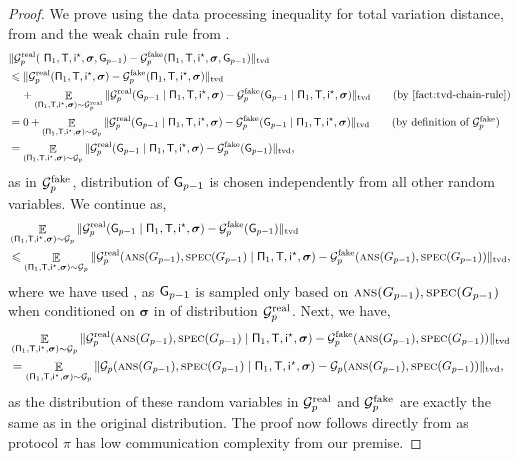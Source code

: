 \documentclass[11pt]{article}
\theoremstyle{definition}
\renewcommand{\leq}{\leqslant}
\newcommand{\tvd}[2]{\ensuremath{\norm{#1 - #2}_{\mathrm{tvd}}}}
\newcommand{\norm}[1]{\ensuremath{\|#1\|}}
\DeclareMathOperator*{\Exp}{\ensuremath{{\mathbb{E}}}}
\newcommand{\rv}[1]{\ensuremath{{\mathsf{#1}}}\xspace}
\newcommand{\cG}{\ensuremath{\mathcal{G}}}
\newcommand{\ans}{\ensuremath{\textnormal{\textsc{ans}}}}
\newcommand{\spec}{\ensuremath{\textnormal{\textsc{spec}}}}
\newcommand{\prot}{\ensuremath{\pi}}
\newcommand{\Prot}{\ensuremath{\Pi}}
\newcommand{\rProt}{\ensuremath{\rv{\Prot}}}
\newcommand{\rT}{\ensuremath{\rv{T}}}
\newcommand{\rsigma}{\ensuremath{\bm{\sigma}}}
\begin{document}
	\begin{proof}
		We prove  using the data processing inequality for total variation distance, from  and the weak chain rule from . 
		\begin{align*}
			&\tvd{\cGreal_p(\ \rProt_1, \rT, \ristar, \rsigma, \rG_{p-1})}{\cGfake_p(\rProt_1, \rT, \ristar, \rsigma, \rG_{p-1})} \\
			&\leq \tvd{\cGreal_p( \rProt_1, \rT, \ristar, \rsigma)}{\cGfake_p(\rProt_1, \rT, \ristar, \rsigma)} \\
			&\hspace{4mm} + \Exp_{ (\rProt_1, \rT, \ristar, \rsigma) \sim \cGreal_p} \tvd{\cGreal_p(\rG_{p-1} \mid  \rProt_1, \rT, \ristar, \rsigma)}{\cGfake_p(\rG_{p-1} \mid \rProt_1, \rT, \ristar, \rsigma)} \tag{by \Cref{fact:tvd-chain-rule}} \\
			&= 0 + \Exp_{ (\rProt_1, \rT, \ristar, \rsigma) \sim \cG_p} \tvd{\cGreal_p(\rG_{p-1} \mid  \rProt_1, \rT, \ristar, \rsigma)}{\cGfake_p(\rG_{p-1} \mid \rProt_1, \rT, \ristar, \rsigma)} \tag{by definition of $\cGfake_p$} \\
			&= \Exp_{ (\rProt_1, \rT, \ristar, \rsigma) \sim \cG_p} \tvd{\cGreal_p(\rG_{p-1} \mid  \rProt_1, \rT, \ristar, \rsigma)}{\cGfake_p(\rG_{p-1})},
		\end{align*}
		as in $\mathcal{G}^{\textnormal{fake}}_p$, distribution of $\rG_{p-1}$ is chosen independently from all other random variables. 
		We continue as, 
		\begin{align*}
			& \Exp_{ (\rProt_1, \rT, \ristar, \rsigma) \sim \cG_p} \tvd{\cGreal_p(\rG_{p-1} \mid  \rProt_1, \rT, \ristar, \rsigma)}{\cGfake_p(\rG_{p-1})}\\
			&\leq \Exp_{ (\rProt_1, \rT, \ristar, \rsigma) \sim \cG_p} \tvd{\cGreal_p(\ans(G_{p-1}), \spec(G_{p-1}) \mid  \rProt_1, \rT, \ristar, \rsigma)}{\cGfake_p(\ans(G_{p-1}), \spec(G_{p-1}))},  
		\end{align*}
		where we have used , as $\rG_{p-1}$ is sampled only based on $\ans(G_{p-1}), \spec(G_{p-1})$ when conditioned on $\rsigma$ in  of distribution $\mathcal{G}^{\textnormal{real}}_p$. 
		Next, we have, 
		\begin{align*}
			& \Exp_{ (\rProt_1, \rT, \ristar, \rsigma) \sim \cG_p} \tvd{\cGreal_p(\ans(G_{p-1}), \spec(G_{p-1}) \mid  \rProt_1, \rT, \ristar, \rsigma)}{\cGfake_p(\ans(G_{p-1}), \spec(G_{p-1}))} \\
			& =  \Exp_{ (\rProt_1, \rT, \ristar, \rsigma) \sim \cG_p} \tvd{\cG_p(\ans(G_{p-1}), \spec(G_{p-1}) \mid  \rProt_1, \rT, \ristar, \rsigma)}{\cG_p(\ans(G_{p-1}), \spec(G_{p-1}))},
		\end{align*}
		as the distribution of these random variables in $\mathcal{G}^{\textnormal{real}}_p$ and $\mathcal{G}^{\textnormal{fake}}_p$ are exactly the same as in the original distribution. 
		The proof now follows directly from  as protocol $\prot$ has low communication complexity from our premise. 
	\end{proof}
	
\end{document}
